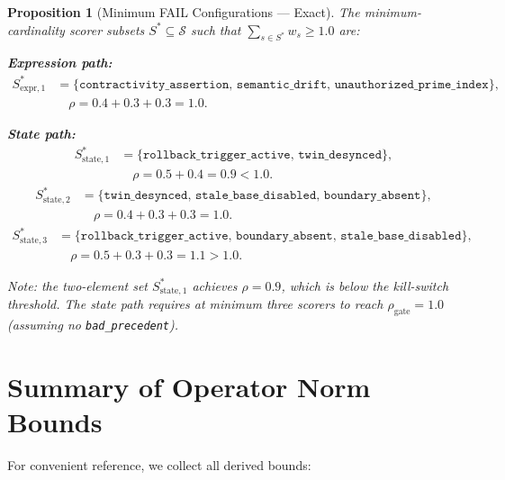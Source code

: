 \documentclass[11pt,letterpaper]{article}
\newtheorem{proposition}[theorem]{Proposition}
\theoremstyle{remark}
\newcommand{\rhogate}{\rho_{\mathrm{gate}}}
\newcommand{\rhosys}{\rho}
\begin{document}
\begin{proposition}[Minimum FAIL Configurations — Exact]
\label{prop:min-fail}
The minimum-cardinality scorer subsets $S^* \subseteq \mathcal{S}$
such that $\sum_{s \in S^*} w_s \geq 1.0$ are:

\textbf{Expression path:}
\begin{align}
  S^*_{\text{expr},1} &= \{\texttt{contractivity\_assertion},\,
    \texttt{semantic\_drift},\,
    \texttt{unauthorized\_prime\_index}\}, \nonumber\\
  &\quad \rhosys = 0.4 + 0.3 + 0.3 = 1.0. \tag{A31}
\end{align}

\textbf{State path:}
\begin{align}
  S^*_{\text{state},1} &= \{\texttt{rollback\_trigger\_active},\,
    \texttt{twin\_desynced}\}, \nonumber\\
  &\quad \rhosys = 0.5 + 0.4 = 0.9 < 1.0. \tag{A32}
\end{align}
\begin{align}
  S^*_{\text{state},2} &= \{\texttt{twin\_desynced},\,
    \texttt{stale\_base\_disabled},\,
    \texttt{boundary\_absent}\}, \nonumber\\
  &\quad \rhosys = 0.4 + 0.3 + 0.3 = 1.0. \tag{A33}
\end{align}
\begin{align}
  S^*_{\text{state},3} &= \{\texttt{rollback\_trigger\_active},\,
    \texttt{boundary\_absent},\,
    \texttt{stale\_base\_disabled}\}, \nonumber\\
  &\quad \rhosys = 0.5 + 0.3 + 0.3 = 1.1 > 1.0. \tag{A34}
\end{align}

Note: the two-element set $S^*_{\text{state},1}$ achieves $\rhosys = 0.9$,
which is \emph{below} the kill-switch threshold.  The state path requires
\emph{at minimum three scorers} to reach $\rhogate = 1.0$ (assuming no
\texttt{bad\_precedent}).
\end{proposition}

\section{Summary of Operator Norm Bounds}
\label{sec:summary}

For convenient reference, we collect all derived bounds:
\end{document}
